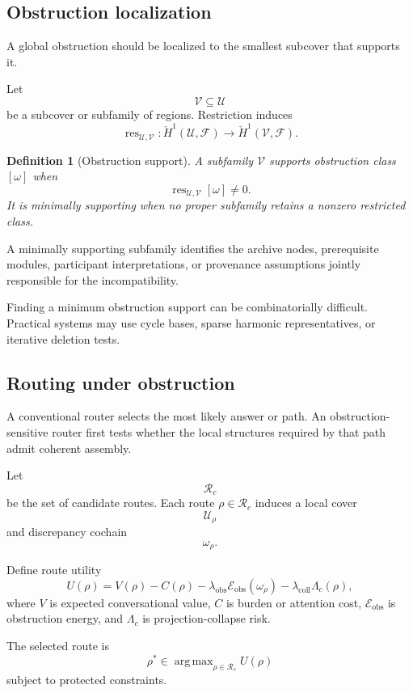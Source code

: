 \documentclass[11pt]{article}
\newtheorem{definition}{Definition}[section]
\theoremstyle{definition}
\DeclareMathOperator{\argmax}{arg\,max}
\begin{document}
\subsection{Obstruction localization}

A global obstruction should be localized to the smallest subcover that supports it.

Let
\[
\mathcal V\subseteq\mathcal U
\]
be a subcover or subfamily of regions. Restriction induces
\[
\operatorname{res}_{\mathcal U,\mathcal V}:
\check H^1(\mathcal U,\mathscr F)
\to
\check H^1(\mathcal V,\mathscr F).
\]

\begin{definition}[Obstruction support]
A subfamily \(\mathcal V\) supports obstruction class \([\omega]\) when
\[
\operatorname{res}_{\mathcal U,\mathcal V}[\omega]\neq0.
\]
It is minimally supporting when no proper subfamily retains a nonzero restricted class.
\end{definition}

A minimally supporting subfamily identifies the archive nodes, prerequisite modules, participant interpretations, or provenance assumptions jointly responsible for the incompatibility.

Finding a minimum obstruction support can be combinatorially difficult. Practical systems may use cycle bases, sparse harmonic representatives, or iterative deletion tests.

\subsection{Routing under obstruction}

A conventional router selects the most likely answer or path. An obstruction-sensitive router first tests whether the local structures required by that path admit coherent assembly.

Let
\[
\mathcal R_c
\]
be the set of candidate routes. Each route \(\rho\in\mathcal R_c\) induces a local cover
\[
\mathcal U_\rho
\]
and discrepancy cochain
\[
\omega_\rho.
\]

Define route utility
\[
U(\rho)
=
V(\rho)
-
C(\rho)
-
\lambda_{\mathrm{obs}}
\mathcal E_{\mathrm{obs}}(\omega_\rho)
-
\lambda_{\mathrm{coll}}
\Lambda_c(\rho),
\]
where \(V\) is expected conversational value, \(C\) is burden or attention cost, \(\mathcal E_{\mathrm{obs}}\) is obstruction energy, and \(\Lambda_c\) is projection-collapse risk.

The selected route is
\[
\rho^{*}
\in
\argmax_{\rho\in\mathcal R_c}
U(\rho)
\]
subject to protected constraints.
\end{document}
